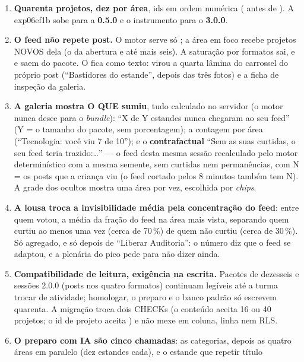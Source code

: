 \begin{enumerate}
  \item \textbf{Quarenta projetos, dez por área}, ids
     em ordem numérica ( antes de
    ). A exp06ef1b sobe para a \textbf{0.5.0} e o instrumento para
    o \textbf{3.0.0}.
  \item \textbf{O feed não repete post.} O motor serve só ; a
    área em foco recebe projetos NOVOS dela (o da abertura e até mais seis). A
    saturação por formatos sai, e  e  saem do
    pacote. O  fica como texto: virou a quarta lâmina do carrossel
    do próprio post (\enquote{Bastidores do estande}, depois das três fotos) e
    a ficha de inspeção da galeria.
  \item \textbf{A galeria mostra O QUE sumiu}, tudo calculado no servidor (o
    motor nunca desce para o \emph{bundle}): \enquote{X de Y estandes nunca
    chegaram ao seu feed} (Y = o tamanho do pacote, sem porcentagem); a
    contagem por área (\enquote{Tecnologia: você viu 7 de 10}); e o
    \textbf{contrafactual} \enquote{Sem as suas curtidas, o seu feed teria
    trazido:\ldots} --- o feed desta mesma sessão recalculado pelo motor
    determinístico com a mesma semente, sem curtidas nem permanências, com N =
    os posts que a criança viu (o feed cortado pelos 8 minutos também tem N).
    A grade dos ocultos mostra uma área por vez, escolhida por \emph{chips}.
  \item \textbf{A lousa troca a invisibilidade média pela concentração do
    feed}: entre quem votou, a média da fração do feed na área mais vista,
    separando quem curtiu ao menos uma vez (cerca de 70\,\%) de quem não curtiu
    (cerca de 30\,\%). Só agregado, e só depois de \enquote{Liberar Auditoria}:
    o número diz que o feed se adaptou, e a plenária do pico pede para não
    dizer ainda.
  \item \textbf{Compatibilidade de leitura, exigência na escrita.} Pacotes de
    dezesseis e sessões 2.0.0 (posts nos quatro formatos) continuam legíveis até
    a turma trocar de atividade; homologar, o preparo e o banco padrão só
    escrevem quarenta. A migração
     troca dois
    CHECKs (o conteúdo aceita 16 ou 40 projetos; o id de projeto aceita
    ) e não mexe em coluna, linha nem RLS.
  \item \textbf{O preparo com IA são cinco chamadas}: as categorias, depois as
    quatro áreas em paralelo (dez estandes cada), e o estande que repetir título

\end{enumerate}
